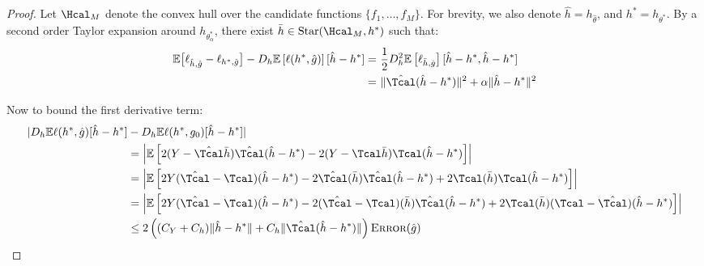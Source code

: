 \documentclass[12pt]{extarticle} %
\newcommand{\E}{\mathbb{E}}
\newcommand{\error}{\ensuremath{\textsc{Error}}}
\begin{document}
\begin{proof}
Let $\Hcal_M$ denote the convex hull over the candidate functions $\{f_1, \dots,f_M\}$. For brevity, we also denote $\hat{h} = h_{\hat{\theta}}$, and $h^* = h_{\theta^*}$. By a second order Taylor expansion around $h_{\theta^*_{\alpha}}$, there exist $\bar{h}\in\text{Star}(\Hcal_M,h^*)$ such that:
\begin{align*}
    \E\big[\ell_{\hat{h},\hat{g}} - \ell_{h^*,\hat{g}}\big] - D_{h}\E\left[\ell(h^*,\hat{g})\right][\hat{h}-h^*] =~& \frac{1}{2}D_{h}^2 \E\left[\ell_{\bar{h},\hat{g}}\right][\hat{h} - h^*,\hat{h}-h^*]\\
     =~& \|\hat{\Tcal} (\hat{h}-h^*)\|^2 + \alpha\|\hat{h}-h^*\|^2\\
\end{align*}

Now to bound the first derivative term:
\begin{align*}
    |D_{h}\E\ell(h^*,\hat{g})[\hat{h}-h^*] &-D_{h}\E\ell(h^*,g_0)[\hat{h}-h^*] |\\
    &= \left|\E\left[ 2(Y-\hat{\Tcal}\bar{h})\hat{\Tcal}(\hat{h}-h^*) -2(Y-{\Tcal}\bar{h}){\Tcal}(\hat{h}-h^*) \right] \right|\\
    &= \left|\E\left[ 2Y(\hat{\Tcal}-\Tcal)(\hat{h}-h^*) - 2\hat{\Tcal}(\bar{h})\hat{\Tcal}(\hat{h}-h^*)+2{\Tcal}(\bar{h}){\Tcal}(\hat{h}-h^*)\right] \right|\\
    &= \left|\E\left[ 2Y(\hat{\Tcal}-\Tcal)(\hat{h}-h^*) - 2(\hat{\Tcal}-\Tcal)(\bar{h})\hat{\Tcal}(\hat{h}-h^*)+2{\Tcal}(\bar{h})(\Tcal-\hat{\Tcal})(\hat{h}-h^*)\right] \right|\\
    & \leq 2\left((C_Y+C_h)\|\hat{h}-h^*\| + C_h\|\hat{\Tcal}(\hat{h}-h^*)\|\right)\error(\hat{g})\\
\end{align*}



\end{proof}
\end{document}
